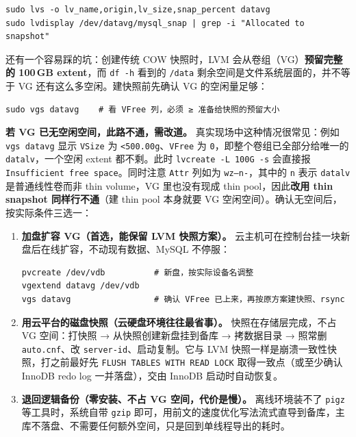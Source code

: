 \documentclass[12pt,UTF8]{ctexbook}
\begin{document}
\begin{lstlisting}
sudo lvs -o lv_name,origin,lv_size,snap_percent datavg
sudo lvdisplay /dev/datavg/mysql_snap | grep -i "Allocated to snapshot"
\end{lstlisting}

还有一个容易踩的坑：创建传统 COW 快照时，LVM 会从卷组（VG）\textbf{预留完整的 100\,GB extent}，而 \texttt{df -h} 看到的 \texttt{/data} 剩余空间是文件系统层面的，并不等于 VG 还有这么多空闲。建快照前先确认 VG 的空闲量足够：

\begin{lstlisting}
sudo vgs datavg    # 看 VFree 列，必须 ≥ 准备给快照的预留大小
\end{lstlisting}

\textbf{若 VG 已无空闲空间，此路不通，需改道。} 真实现场中这种情况很常见：例如 \texttt{vgs datavg} 显示 \texttt{VSize} 为 \texttt{<500.00g}、\texttt{VFree} 为 \texttt{0}，即整个卷组已全部分给唯一的 \texttt{datalv}，一个空闲 extent 都不剩。此时 \texttt{lvcreate -L 100G -s} 会直接报 \texttt{Insufficient free space}。同时注意 \texttt{Attr} 列如为 \texttt{wz--n-}，其中的 \texttt{n} 表示 \texttt{datalv} 是普通线性卷而非 thin volume，VG 里也没有现成 thin pool，因此\textbf{改用 thin snapshot 同样行不通}（建 thin pool 本身就要 VG 空闲空间）。确认无空间后，按实际条件三选一：

\begin{enumerate}[leftmargin=2cm]
  \item \textbf{加盘扩容 VG（首选，能保留 LVM 快照方案）。} 云主机可在控制台挂一块新盘后在线扩容，不动现有数据、MySQL 不停服：
\begin{lstlisting}
pvcreate /dev/vdb          # 新盘，按实际设备名调整
vgextend datavg /dev/vdb
vgs datavg                 # 确认 VFree 已上来，再按原方案建快照、rsync
\end{lstlisting}
  \item \textbf{用云平台的磁盘快照（云硬盘环境往往最省事）。} 快照在存储层完成，不占 VG 空间：打快照 → 从快照创建新盘挂到备库 → 拷数据目录 → 照常删 \texttt{auto.cnf}、改 \texttt{server-id}、启动复制。它与 LVM 快照一样是崩溃一致性快照，打之前最好先 \texttt{FLUSH TABLES WITH READ LOCK} 取得一致点（或至少确认 InnoDB redo log 一并落盘），交由 InnoDB 启动时自动恢复。
  \item \textbf{退回逻辑备份（零安装、不占 VG 空间，代价是慢）。} 离线环境装不了 \texttt{pigz} 等工具时，系统自带 \texttt{gzip} 即可，用前文的速度优化写法流式直导到备库，主库不落盘、不需要任何额外空间，只是回到单线程导出的耗时。
\end{enumerate}
\end{document}
